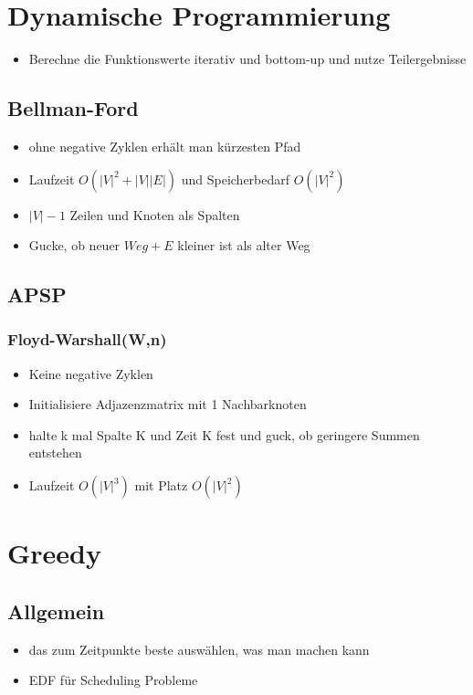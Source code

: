 \documentclass{article}
\begin{document}
\section{Dynamische Programmierung}
\begin{itemize}
\item Berechne die Funktionswerte iterativ und bottom-up und nutze Teilergebnisse
\end{itemize}

\subsection{Bellman-Ford}
\begin{itemize}
\item ohne negative Zyklen erh{\"a}lt man k{\"u}rzesten Pfad
\item  Laufzeit $O(|V|^2+|V||E|)$ und Speicherbedarf $O(|V|^2)$
\item $|V|-1$ Zeilen und Knoten als Spalten 
\item Gucke, ob neuer $Weg+E$ kleiner ist als alter Weg
\end{itemize}
\subsection{APSP}
\subsubsection{Floyd-Warshall(W,n)}
\begin{itemize}
\item Keine negative Zyklen
\item Initialisiere Adjazenzmatrix mit 1 Nachbarknoten
\item halte k mal Spalte K und Zeit K fest und guck, ob geringere Summen entstehen
\item Laufzeit $O(|V|^3)$ mit Platz $O(|V|^2)$
\end{itemize}



\section{Greedy}
\subsection{Allgemein}
\begin{itemize}
\item das zum Zeitpunkte beste ausw{\"a}hlen, was man machen kann
\item EDF f{\"u}r Scheduling Probleme
\end{itemize}
 
\end{document}
